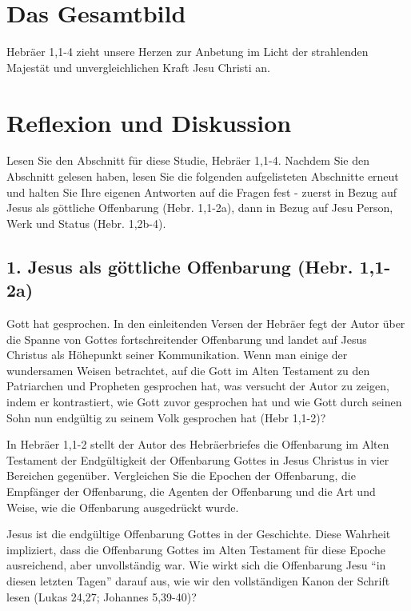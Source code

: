 \documentclass[]{book}
\begin{document}
\section{Das Gesamtbild}\label{das-gesamtbild}

Hebräer 1,1-4 zieht unsere Herzen zur Anbetung im Licht der strahlenden
Majestät und unvergleichlichen Kraft Jesu Christi an.

\section{Reflexion und Diskussion}\label{reflexion-und-diskussion}

Lesen Sie den Abschnitt für diese Studie, Hebräer 1,1-4. Nachdem Sie den
Abschnitt gelesen haben, lesen Sie die folgenden aufgelisteten
Abschnitte erneut und halten Sie Ihre eigenen Antworten auf die Fragen
fest - zuerst in Bezug auf Jesus als göttliche Offenbarung (Hebr.
1,1-2a), dann in Bezug auf Jesu Person, Werk und Status (Hebr. 1,2b-4).

\subsection{1. Jesus als göttliche Offenbarung (Hebr.
1,1-2a)}\label{jesus-als-guxf6ttliche-offenbarung-hebr.-11-2a}

Gott hat gesprochen. In den einleitenden Versen der Hebräer fegt der
Autor über die Spanne von Gottes fortschreitender Offenbarung und landet
auf Jesus Christus als Höhepunkt seiner Kommunikation. Wenn man einige
der wundersamen Weisen betrachtet, auf die Gott im Alten Testament zu
den Patriarchen und Propheten gesprochen hat, was versucht der Autor zu
zeigen, indem er kontrastiert, wie Gott zuvor gesprochen hat und wie
Gott durch seinen Sohn nun endgültig zu seinem Volk gesprochen hat (Hebr
1,1-2)?

In Hebräer 1,1-2 stellt der Autor des Hebräerbriefes die Offenbarung im
Alten Testament der Endgültigkeit der Offenbarung Gottes in Jesus
Christus in vier Bereichen gegenüber. Vergleichen Sie die Epochen der
Offenbarung, die Empfänger der Offenbarung, die Agenten der Offenbarung
und die Art und Weise, wie die Offenbarung ausgedrückt wurde.

Jesus ist die endgültige Offenbarung Gottes in der Geschichte. Diese
Wahrheit impliziert, dass die Offenbarung Gottes im Alten Testament für
diese Epoche ausreichend, aber unvollständig war. Wie wirkt sich die
Offenbarung Jesu ``in diesen letzten Tagen'' darauf aus, wie wir den
vollständigen Kanon der Schrift lesen (Lukas 24,27; Johannes 5,39-40)?
\end{document}

